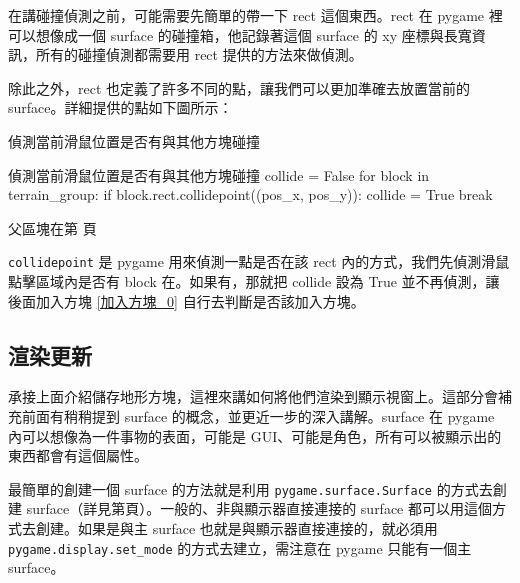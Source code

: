 \documentclass[12pt, a4paper]{siweb}
\begin{document}
在講碰撞偵測之前，可能需要先簡單的帶一下 rect 這個東西。rect 在 pygame 裡可以想像成一個 surface 的碰撞箱，他記錄著這個 surface 的 xy 座標與長寬資訊，所有的碰撞偵測都需要用 rect 提供的方法來做偵測。

除此之外，rect 也定義了許多不同的點，讓我們可以更加準確去放置當前的 surface。詳細提供的點如下圖所示：

\begin{center}
\end{center}
\newpage

\begin{siweb}{偵測當前滑鼠位置是否有與其他方塊碰撞}
\begin{mylisting}{偵測當前滑鼠位置是否有與其他方塊碰撞}
collide = False
for block in terrain_group:
	if block.rect.collidepoint((pos_x, pos_y)):
		collide = True
		break
\end{mylisting}
\label{偵測當前滑鼠位置是否有與其他方塊碰撞_0}
父區塊在第\pageref{偵測當前滑鼠位置是否有與其他方塊碰撞_father} 頁
\end{siweb}

\verb|collidepoint| 是 pygame 用來偵測一點是否在該 rect 內的方式，我們先偵測滑鼠點擊區域內是否有 block 在。如果有，那就把 collide 設為 True 並不再偵測，讓後面加入方塊 \ref{加入方塊_0} 自行去判斷是否該加入方塊。

\subsection{渲染更新}

承接上面介紹儲存地形方塊，這裡來講如何將他們渲染到顯示視窗上。這部分會補充前面有稍稍提到 surface 的概念，並更近一步的深入講解。surface 在 pygame 內可以想像為一件事物的表面，可能是 GUI、可能是角色，所有可以被顯示出的東西都會有這個屬性。

最簡單的創建一個 surface 的方法就是利用 \verb|pygame.surface.Surface| 的方式去創建 surface（詳見第\pageref{物件定義_0}頁）。一般的、非與顯示器直接連接的 surface 都可以用這個方式去創建。如果是與主 surface 也就是與顯示器直接連接的，就必須用 \verb|pygame.display.set_mode| 的方式去建立，需注意在 pygame 只能有一個主 surface。
\end{document}
